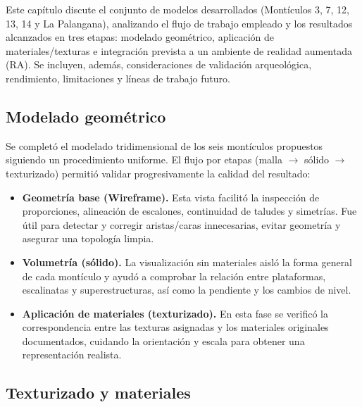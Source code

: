 

Este capítulo discute el conjunto de modelos desarrollados (Montículos 3, 7, 12, 13, 14 y La Palangana), analizando el flujo de trabajo empleado y los resultados alcanzados en tres etapas: modelado geométrico, aplicación de materiales/texturas e integración prevista a un ambiente de realidad aumentada (RA). Se incluyen, además, consideraciones de validación arqueológica, rendimiento, limitaciones y líneas de trabajo futuro.

\subsection{Modelado geométrico}

Se completó el modelado tridimensional de los seis montículos propuestos siguiendo un procedimiento uniforme. El flujo por etapas (malla $\rightarrow$ sólido $\rightarrow$ texturizado) permitió validar progresivamente la calidad del resultado:
\begin{itemize}
    \item \textbf{Geometría base (\gls{Wireframe}).} Esta vista facilitó la inspección de proporciones, alineación de escalones, continuidad de taludes y simetrías. Fue útil para detectar y corregir aristas/caras innecesarias, evitar geometría y asegurar una topología limpia.
    \item \textbf{Volumetría (sólido).} La visualización sin materiales aisló la forma general de cada montículo y ayudó a comprobar la relación entre plataformas, escalinatas y superestructuras, así como la pendiente y los cambios de nivel.
    \item \textbf{Aplicación de materiales (texturizado).} En esta fase se verificó la correspondencia entre las texturas asignadas y los materiales originales documentados, cuidando la orientación y escala para obtener una representación realista.

\end{itemize}

\subsection{Texturizado y materiales}


